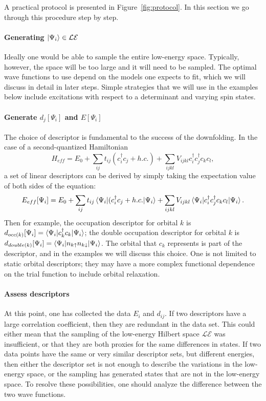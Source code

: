 A practical protocol is presented in Figure~\ref{fig:protocol}. 
In this section we go through this procedure step by step.

\paragraph{Generating $\ket{\Psi_i}\in \mathcal{LE}$}
Ideally one would be able to sample the entire low-energy space. 
Typically, however, the space will be too large and it will need to be sampled. 
The optimal wave functions to use depend on the models one expects to fit, which we will discuss in detail  in later steps. 
Simple strategies that we will use in the examples below include excitations with respect to a determinant and varying spin states.


\paragraph{Generate $d_j[\Psi_i]$ and $E[\Psi_i]$} 
The choice of descriptor is fundamental to the success of the downfolding. 
In the case of a second-quantized Hamiltonian
\begin{equation}\label{eq:Heff_ansatz}
H_{eff} = E_0 + \sum_{ij} t_{ij} (c_i^\dagger c_j + h.c.) + \sum_{ijkl} V_{ijkl} c_i^\dagger c_j^\dagger c_k c_l,
\end{equation}
a set of linear descriptors can be derived by simply taking the expectation value of both sides of the equation:
\begin{equation}
E_{eff}[\Psi_i] = E_0 + 
\sum_{ij} t_{ij} \braket{\Psi_i|(c_i^\dagger c_j + h.c.|\Psi_i}+ 
\sum_{ijkl} V_{ijkl} \braket{\Psi_i | c_i^\dagger c_j^\dagger c_k c_l|\Psi_i}.
\label{eqn:effh}
\end{equation}
Then for example, the occupation descriptor for orbital $k$ is $d_{occ(k)}[\Psi_i] = \braket{\Psi_i | c_k^\dagger c_k | \Psi_i}$; the double occupation descriptor for orbital $k$ is $d_{double(k)}[\Psi_i] = \braket{\Psi_i | n_{k\uparrow}n_{k\downarrow} | \Psi_i}$. 
The orbital that $c_k$ represents is part of the descriptor, and in the examples we will discuss this choice.
One is not limited to static orbital descriptors; they may have a more complex functional dependence on the trial function to include orbital relaxation.

 
\paragraph{Assess descriptors}
At this point, one has collected the data $E_i$ and $d_{ij}$. 
If two descriptors have a large correlation coefficient, then they are redundant in the data set. 
This could either mean that the sampling of the low-energy Hilbert space $\mathcal{LE}$ was insufficient, or that they are both proxies for the same differences in states. 
If two data points have the same or very similar descriptor sets, but different energies, then either the descriptor set is not enough to describe the variations in the low-energy space, or the sampling has generated states that are not in the low-energy space.
To resolve these possibilities, one should analyze the difference between the two wave functions.  

